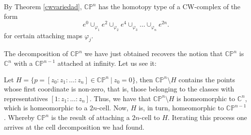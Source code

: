 By Theorem \ref{cwvariedad}, $\mathbb{CP}^n$ has the homotopy type of a CW-complex of the form
\begin{equation*}
    e^0\cup_{\varphi_1} e^2 \cup_{\varphi_2} e^4 \cup_{\varphi_3} \dots \cup_{\varphi_n} e^{2n}.
\end{equation*}
for certain attaching maps $\varphi_j$.

\begin{remark}
    The decomposition of $\mathbb{CP}^n$ we have just obtained recovers the notion that $\mathbb{CP}^n$ is $\mathbb{C}^{n}$ with a $\mathbb{CP}^{n-1}$ attached at infinity. Let us see it:

    Let $H=\{p=[z_0:z_1:\dots:z_n]\in \mathbb{CP}^n ~|~ z_0=0\}$, then $\mathbb{CP}^n\setminus H$ contains the points whose first coordinate is non-zero, that is, those belonging to the classes with representatives $[1:z_1:\dots:z_n]$. Thus, we have that $\mathbb{CP}^n\setminus H$ is homeomorphic to $\mathbb{C}^n$, which is homeomorphic to a $2n$-cell. Now, $H$ is, in turn, homeomorphic to $\mathbb{CP}^{n-1}$. Whereby $\mathbb{CP}^n$ is the result of attaching a $2n$-cell to $H$. Iterating this process one arrives at the cell decomposition we had found.
\end{remark}
